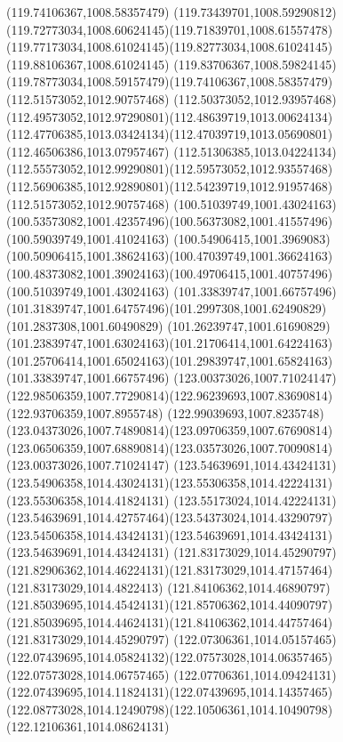 {{	\moveto(119.74106367,1008.58357479)
	\curveto(119.73439701,1008.59290812)(119.72773034,1008.60624145)(119.71839701,1008.61557478)
	\curveto(119.77173034,1008.61024145)(119.82773034,1008.61024145)(119.88106367,1008.61024145)
	\curveto(119.83706367,1008.59824145)(119.78773034,1008.59157479)(119.74106367,1008.58357479)
	\moveto(112.51573052,1012.90757468)
	\curveto(112.50373052,1012.93957468)(112.49573052,1012.97290801)(112.48639719,1013.00624134)
	\curveto(112.47706385,1013.03424134)(112.47039719,1013.05690801)(112.46506386,1013.07957467)
	\curveto(112.51306385,1013.04224134)(112.55573052,1012.99290801)(112.59573052,1012.93557468)
	\curveto(112.56906385,1012.92890801)(112.54239719,1012.91957468)(112.51573052,1012.90757468)
	\moveto(100.51039749,1001.43024163)
	\curveto(100.53573082,1001.42357496)(100.56373082,1001.41557496)(100.59039749,1001.41024163)
	\curveto(100.54906415,1001.3969083)(100.50906415,1001.38624163)(100.47039749,1001.36624163)
	\curveto(100.48373082,1001.39024163)(100.49706415,1001.40757496)(100.51039749,1001.43024163)
	\moveto(101.33839747,1001.66757496)
	\curveto(101.31839747,1001.64757496)(101.2997308,1001.62490829)(101.2837308,1001.60490829)
	\curveto(101.26239747,1001.61690829)(101.23839747,1001.63024163)(101.21706414,1001.64224163)
	\curveto(101.25706414,1001.65024163)(101.29839747,1001.65824163)(101.33839747,1001.66757496)
	\moveto(123.00373026,1007.71024147)
	\curveto(122.98506359,1007.77290814)(122.96239693,1007.83690814)(122.93706359,1007.8955748)
	\curveto(122.99039693,1007.8235748)(123.04373026,1007.74890814)(123.09706359,1007.67690814)
	\curveto(123.06506359,1007.68890814)(123.03573026,1007.70090814)(123.00373026,1007.71024147)
	\moveto(123.54639691,1014.43424131)
	\curveto(123.54906358,1014.43024131)(123.55306358,1014.42224131)(123.55306358,1014.41824131)
	\curveto(123.55173024,1014.42224131)(123.54639691,1014.42757464)(123.54373024,1014.43290797)
	\curveto(123.54506358,1014.43424131)(123.54639691,1014.43424131)(123.54639691,1014.43424131)
	\moveto(121.83173029,1014.45290797)
	\curveto(121.82906362,1014.46224131)(121.83173029,1014.47157464)(121.83173029,1014.4822413)
	\curveto(121.84106362,1014.46890797)(121.85039695,1014.45424131)(121.85706362,1014.44090797)
	\curveto(121.85039695,1014.44624131)(121.84106362,1014.44757464)(121.83173029,1014.45290797)
	\moveto(122.07306361,1014.05157465)
	\curveto(122.07439695,1014.05824132)(122.07573028,1014.06357465)(122.07573028,1014.06757465)
	\curveto(122.07706361,1014.09424131)(122.07439695,1014.11824131)(122.07439695,1014.14357465)
	\curveto(122.08773028,1014.12490798)(122.10506361,1014.10490798)(122.12106361,1014.08624131)
}}
